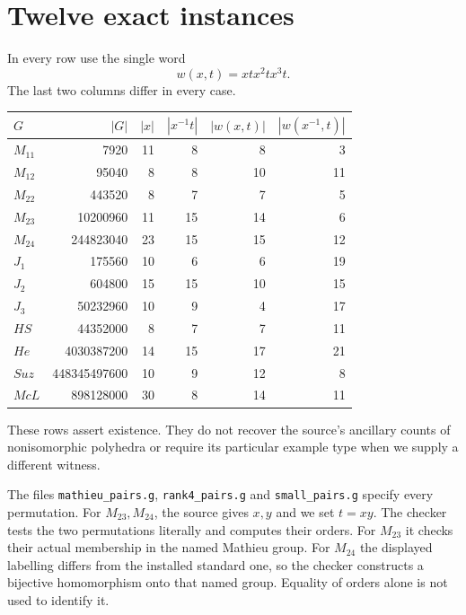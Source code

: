 \documentclass[11pt,a4paper]{article}
\begin{document}
\section{Twelve exact instances}
In every row use the single word
\[
 w(x,t)=x t x^2 t x^3 t.
\]
The last two columns differ in every case.
\begin{center}
\begin{tabular}{lrrrrr}\toprule
$G$&$|G|$&$|x|$&$|x^{-1}t|$&$|w(x,t)|$&$|w(x^{-1},t)|$\\\midrule
$M_{11}$&7920&11&8&8&3\\
$M_{12}$&95040&8&8&10&11\\
$M_{22}$&443520&8&7&7&5\\
$M_{23}$&10200960&11&15&14&6\\
$M_{24}$&244823040&23&15&15&12\\
$J_1$&175560&10&6&6&19\\
$J_2$&604800&15&15&10&15\\
$J_3$&50232960&10&9&4&17\\
$HS$&44352000&8&7&7&11\\
$He$&4030387200&14&15&17&21\\
$Suz$&448345497600&10&9&12&8\\
$McL$&898128000&30&8&14&11\\\bottomrule
\end{tabular}
\end{center}
These rows assert existence. They do not recover the source's ancillary
counts of nonisomorphic polyhedra or require its particular example type
when we supply a different witness.

The files \texttt{mathieu\_pairs.g}, \texttt{rank4\_pairs.g} and
\texttt{small\_pairs.g} specify every permutation. For $M_{23},M_{24}$,
the source gives $x,y$ and we set $t=xy$. The checker tests the two
permutations literally and computes their orders. For $M_{23}$ it
checks their actual membership in the named Mathieu group. For
$M_{24}$ the displayed labelling differs from the installed standard
one, so the checker constructs a bijective homomorphism onto that
named group. Equality of orders alone is not used to identify it.
\end{document}
